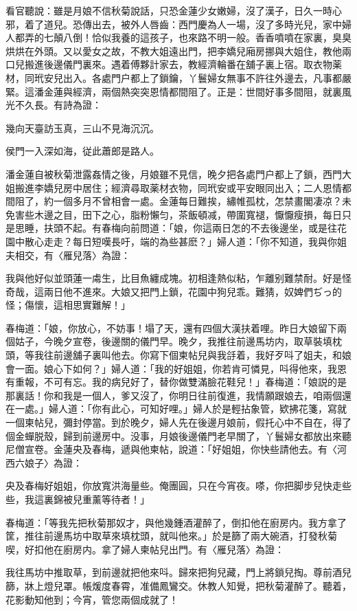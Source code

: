 看官聽說：雖是月娘不信秋菊說話，只恐金蓮少女嫩婦，沒了漢子，日久一時心邪，着了道兒。恐傳出去，被外人唇齒：西門慶為人一場，沒了多時光兒，家中婦人都弄的七顛八倒！恰似我養的這孩子，也來路不明一般。香香噴噴在家裏，臭臭烘烘在外頭。又以愛女之故，不教大姐遠出門，把李嬌兒廂房挪與大姐住，教他兩口兒搬進後邊儀門裏來。遇着傅夥計家去，教經濟輪番在舖子裏上宿。取衣物薬材，同玳安兒出入。各處門户都上了鎖鑰，丫鬟婦女無事不許往外邊去，凡事都嚴緊。這潘金蓮與經濟，兩個熱突突恩情都間阻了。正是：世間好事多間阻，就裏風光不久長。有詩為證：

幾向天臺訪玉真，三山不見海沉沉。

侯門一入深如海，従此蕭郎是路人。

潘金蓮自被秋菊泄露姦情之後，月娘雖不見信，晚夕把各處門户都上了鎖，西門大姐搬進李嬌兒房中居住；經濟尋取薬材衣物，同玳安或平安眼同出入；二人恩情都間阻了，約一個多月不曾相會一處。金蓮每日難挨，繡帷孤枕，怎禁畫閣凄凉？未免害些木邊之目，田下之心，脂粉懶匀，茶飯頓减，帶圍寬褪，懨懨瘦損，每日只是思睡，扶頭不起。有春梅向前問道：「娘，你這兩日怎的不去後邊坐，或是往花園中散心走走？每日短嘆長吁，端的為些甚麽？」婦人道：「你不知道，我與你姐夫相交，有〈雁兒落〉為證：

我與他好似並頭蓮一䖏生，比目魚纏成塊。初相逢熱似粘，乍離别難禁耐。好是怪奇哉，這兩日他不進來。大娘又把門上鎖，花園中狗兒乖。難猜，奴婢們ぢっ的怪；傷懷，這相思實難解！」

春梅道：「娘，你放心，不妨事！塌了天，還有四個大漢扶着哩。昨日大娘留下兩個姑子，今晚夕宣卷，後邊關的儀門早。晚夕，我推往前邊馬坊内，取草裝填枕頭，等我往前邊舖子裏叫他去。你寫下個柬帖兒與我㧱着，我好歹呌了姐夫，和娘會一面。娘心下如何？」婦人道：「我的好姐姐，你若肯可憐見，呌得他來，我恩有重報，不可有忘。我的病兒好了，替你做雙滿臉花鞋兒！」春梅道：「娘説的是那裏話！你和我是一個人，爹又沒了，你明日往前復進，我情願跟娘去，咱兩個還在一處。」婦人道：「你有此心，可知好哩。」婦人於是輕拈象管，欵拂花箋，寫就一個柬帖兒，彌封停當。到於晚夕，婦人先在後邊月娘前，假托心中不自在，得了個金蟬脱殼，歸到前邊房中。没事，月娘後邊儀門老早關了，丫鬟婦女都放出來聽尼僧宣卷。金蓮央及春梅，遞與他柬帖，說道：「好姐姐，你快些請他去。有〈河西六娘子〉為證：

央及春梅好姐姐，你放寬洪海量些。俺團圓，只在今宵夜。嗏，你把脚步兒快走些些，我這裏錦被兒重薰等待者！」

春梅道：「等我先把秋菊那奴才，與他幾鍾酒灌醉了，倒扣他在廚房内。我方拿了筐，推往前邊馬坊中取草來填枕頭，就叫他來。」於是篩了兩大碗酒，打發秋菊喫，好扣他在廚房内。拿了婦人柬帖兒出門。有〈雁兒落〉為證：

我往馬坊中推取草，到前邊就把他來呌。歸來把狗兒藏，門上將鎖兒掏。尊前酒兒篩，牀上燈兒罩。帳煖度春霄，准備鳳鸞交。休教人知覺，把秋菊灌醉了。聽着，花影動知他到；今宵，管您兩個成就了！

